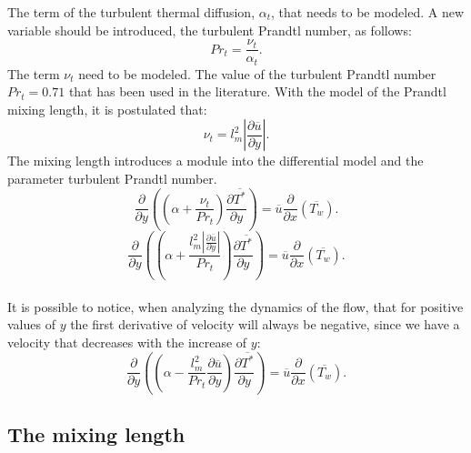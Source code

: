 \documentclass[10pt]{article} %
\begin{document}
The term of the turbulent thermal diffusion, $\alpha_t$, that needs to be modeled. A new variable should be introduced, the turbulent Prandtl number, as follows:
\begin{equation}
Pr_t = \frac{\nu_t}{\alpha_t}.
\end{equation} 
The term $ \nu_t $ need to be modeled. The value of the turbulent Prandtl number $ Pr_t = 0.71 $ that has been used in the literature.
With the model of the Prandtl mixing length, it is postulated that:
\begin{equation}
\nu_t = {l^2_m} \left| \frac{\partial \overline{u}}{\partial y} \right|.
\end{equation}
The mixing length introduces a module into the differential model and the parameter turbulent Prandtl number.
\\
\begin{equation}
{\frac{\partial{}}{\partial{y}}} \left( \left( \alpha   
+ \frac{\nu_t}{Pr_t} \right) \frac{\partial \overline{T^\ast}}{\partial y} \right)
= 
\overline{u}\frac{\partial{}}{\partial{x}}\left(\overline{T_w}\right)  .
\end{equation}
\begin{equation}
{\frac{\partial{}}{\partial{y}}} \left( \left( \alpha   
+ \frac{{l^2_m} \left| \frac{\partial \overline{u}}{\partial y} \right|}{Pr_t} \right) \frac{\partial \overline{T^\ast}}{\partial y} \right)
= 
\overline{u}\frac{\partial{}}{\partial{x}}\left(\overline{T_w}\right)  .
\end{equation}
\\

It is possible to notice, when analyzing the dynamics of the flow, that for positive values of $ y $ the first derivative of velocity will always be negative, since we have a velocity that decreases with the increase of $ y $:\\
\begin{equation}
{\frac{\partial{}}{\partial{y}}} \left( \left( \alpha   
- \frac{{l^2_m}}{Pr_t}\frac{\partial \overline{u}}{\partial y} \right) \frac{\partial \overline{T^\ast}}{\partial y} \right)
= 
\overline{u}\frac{\partial{}}{\partial{x}}\left(\overline{T_w}\right)  .
\end{equation}



\subsection{The mixing length}
\end{document}
